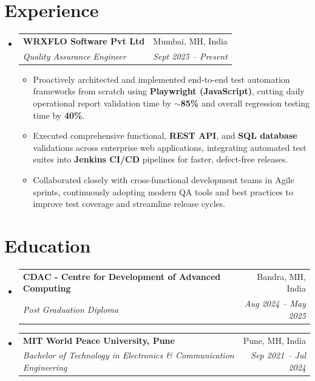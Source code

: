 \documentclass[a4paper,11pt]{article}
\makeatletter
\newcommand{\resumeItem}[1]{
  \item\small{#1}
}
\newcommand{\resumeItemListStart}{\begin{itemize}[rightmargin=0.11in]}
\newcommand{\resumeItemListEnd}{\end{itemize}}
\newcommand{\resumeQuadHeading}[4]{
  \item
  \begin{tabular*}{0.96\textwidth}[t]{l@{\extracolsep{\fill}}r}
    \textbf{#1} & #2 \\
    \textit{\small#3} & \textit{\small #4} \\
  \end{tabular*}
}
\newcommand{\resumeHeadingListStart}{
  \begin{itemize}[leftmargin=0.15in, label={}]
}
\newcommand{\resumeHeadingListEnd}{\end{itemize}}
\makeatother
\begin{document}
\section{Experience}
  \resumeHeadingListStart{}
    \resumeQuadHeading{WRXFLO Software Pvt Ltd}{Mumbai, MH, India}
    {Quality Assurance Engineer}{Sept 2025 -- Present}
      \resumeItemListStart{}
        \resumeItem{Proactively architected and implemented end-to-end test automation frameworks from scratch using \textbf{Playwright (JavaScript)}, cutting daily operational report validation time by \textbf{$\sim$85\%} and overall regression testing time by \textbf{40\%}.}
        \resumeItem{Executed comprehensive functional, \textbf{REST API}, and \textbf{SQL database} validations across enterprise web applications, integrating automated test suites into \textbf{Jenkins CI/CD} pipelines for faster, defect-free releases.}
        \resumeItem{Collaborated closely with cross-functional development teams in Agile sprints, continuously adopting modern QA tools and best practices to improve test coverage and streamline release cycles.}
      \resumeItemListEnd{}
  \resumeHeadingListEnd{}



\section{Education}
  \resumeHeadingListStart{}
    \resumeQuadHeading{CDAC - Centre for Development of Advanced Computing}{Bandra, MH, India}
    {Post Graduation Diploma}{Aug 2024 -- May 2025}
    \resumeQuadHeading{MIT World Peace University, Pune}{Pune, MH, India}
    {Bachelor of Technology in Electronics \& Communication Engineering}{Sep 2021 -- Jul 2024}
  \resumeHeadingListEnd{}



\end{document}

